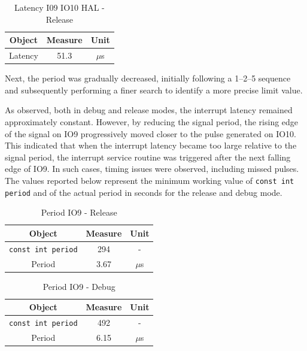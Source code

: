 \documentclass[../main.tex]{subfiles}
\begin{document}
\begin{table}[h!]
\centering
\begin{tabular}{ccc}

\textbf{Object} & \textbf{Measure} & \textbf{Unit} \\
\hline
Latency & 51.3 & $\mu$s  \\

\end{tabular}
\caption{Latency I09 IO10 HAL - Release}
\label{tab:example}
\end{table}


Next, the period was gradually decreased, initially following a 1–2–5 sequence and subsequently performing a finer search to identify a more precise limit value.

As observed, both in debug and release modes, the interrupt latency remained approximately constant. 
However, by reducing the signal period, the rising edge of the signal on IO9 progressively moved closer to the pulse generated on IO10. This indicated that when the interrupt latency became too large relative to the signal period, the interrupt service routine was triggered after the next falling edge of IO9. In such cases, timing issues were observed, including missed pulses.\\

The values reported below represent the minimum working value of \texttt{const int period} and of the actual period in seconds for the release and debug mode.\\

\begin{table}[h!]
\centering
\begin{tabular}{ccc}

\textbf{Object} & \textbf{Measure} & \textbf{Unit} \\
\hline
\texttt{const int period} & 294 & - \\
\hline
Period & 3.67 & $\mu$s
\end{tabular}
\caption{Period IO9 - Release}
\label{tab:example}
\end{table}

\begin{table}[h!]
\centering
\begin{tabular}{ccc}
\textbf{Object} & \textbf{Measure} & \textbf{Unit} \\
\hline
\texttt{const int period} & 492 & -  \\
\hline
Period & 6.15 & $\mu$s
\end{tabular}
\caption{Period IO9 - Debug}
\label{tab:example}
\end{table}
\end{document}
